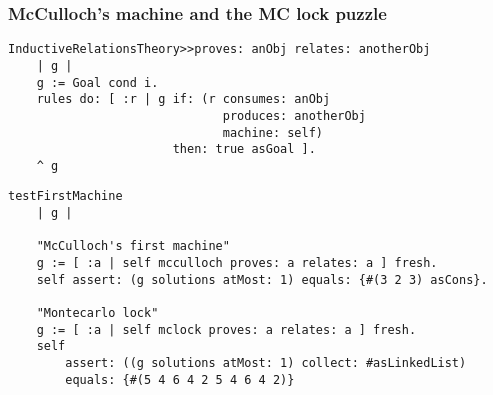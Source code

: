 \documentclass{beamer}
\begin{document}
\begin{frame}[fragile]
\frametitle{McCulloch's machine and the MC lock puzzle}
\begin{verbatim}
InductiveRelationsTheory>>proves: anObj relates: anotherObj
    | g |
    g := Goal cond i.
    rules do: [ :r | g if: (r consumes: anObj
                              produces: anotherObj
                              machine: self)
                       then: true asGoal ].
    ^ g
\end{verbatim}
\begin{verbatim}
testFirstMachine
    | g |

    "McCulloch's first machine"
    g := [ :a | self mcculloch proves: a relates: a ] fresh.
    self assert: (g solutions atMost: 1) equals: {#(3 2 3) asCons}.

    "Montecarlo lock"
    g := [ :a | self mclock proves: a relates: a ] fresh.
    self
        assert: ((g solutions atMost: 1) collect: #asLinkedList)
        equals: {#(5 4 6 4 2 5 4 6 4 2)}
\end{verbatim}
\end{frame}
\end{document}
